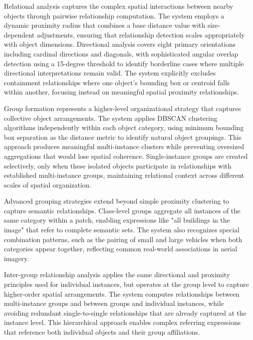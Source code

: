 Relational analysis captures the complex spatial interactions between nearby objects through pairwise relationship computation. The system employs a dynamic proximity radius that combines a base distance value with size-dependent adjustments, ensuring that relationship detection scales appropriately with object dimensions. Directional analysis covers eight primary orientations including cardinal directions and diagonals, with sophisticated angular overlap detection using a 15-degree threshold to identify borderline cases where multiple directional interpretations remain valid. The system explicitly excludes containment relationships where one object's bounding box or centroid falls within another, focusing instead on meaningful spatial proximity relationships.

Group formation represents a higher-level organizational strategy that captures collective object arrangements. The system applies DBSCAN clustering algorithms independently within each object category, using minimum bounding box separation as the distance metric to identify natural object groupings. This approach produces meaningful multi-instance clusters while preventing oversized aggregations that would lose spatial coherence. Single-instance groups are created selectively, only when these isolated objects participate in relationships with established multi-instance groups, maintaining relational context across different scales of spatial organization.

Advanced grouping strategies extend beyond simple proximity clustering to capture semantic relationships. Class-level groups aggregate all instances of the same category within a patch, enabling expressions like "all buildings in the image" that refer to complete semantic sets. The system also recognizes special combination patterns, such as the pairing of small and large vehicles when both categories appear together, reflecting common real-world associations in aerial imagery.

Inter-group relationship analysis applies the same directional and proximity principles used for individual instances, but operates at the group level to capture higher-order spatial arrangements. The system computes relationships between multi-instance groups and between groups and individual instances, while avoiding redundant single-to-single relationships that are already captured at the instance level. This hierarchical approach enables complex referring expressions that reference both individual objects and their group affiliations.

